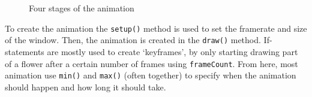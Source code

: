 \begin{figure}[H]
\begin{subfigure}[t]{.4\textwidth}
    \end{subfigure}

    \caption{Four stages of the animation}
    \label{fig: animation}

\end{figure}

To create the animation the \texttt{setup()} method is used to set the framerate and size of the window. Then, the animation is created in the \texttt{draw()} method. If-statements are mostly used to create `keyframes', by only starting drawing part of a flower after a certain number of frames using \texttt{frameCount}. From here, most animation use \texttt{min()} and \texttt{max()} (often together) to specify when the animation should happen and how long it should take.